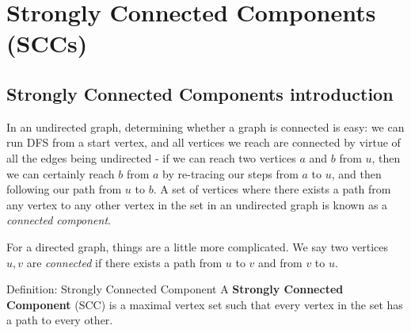 \documentclass{article}
\begin{document}
\section{Strongly Connected Components (SCCs)}
\subsection{Strongly Connected Components introduction}

In an undirected graph, determining whether a graph is connected is easy: we can run DFS from a start vertex, and all vertices we reach are connected by virtue of all the edges being undirected - if we can reach two vertices $a$ and $b$ from $u$, then we can certainly reach $b$ from $a$ by re-tracing our steps from $a$ to $u$, and then following our path from $u$ to $b$. A set of vertices where there exists a path from any vertex to any other vertex in the set in an undirected graph is known as a \textit{connected component}.

For a directed graph, things are a little more complicated. We say two vertices $u, v$ are \textit{connected} if there exists a path from $u$ to $v$ and from $v$ to $u$.

\begin{definition}{Definition: Strongly Connected Component}
    A \textbf{Strongly Connected Component} (SCC) is a maximal vertex set such that every vertex in the set has a path to every other.
\end{definition}
\end{document}
